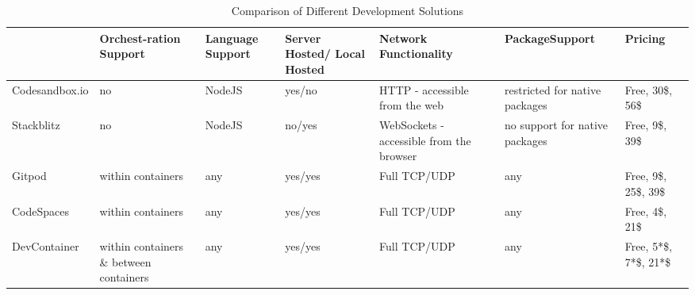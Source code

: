 
\begin{landscape}
\begin{table}[]
    \begin{tabular}{@{}lp{}p{}p{}p{}p{}p{}@{}}
    \toprule
                    & Orchest-ration Support                   & Language Support & Server Hosted/ Local Hosted & Network \newline Functionality                      & Package\newline Support                & Pricing             \\ \toprule
    \rowcolor[HTML]{9B9B9B} Codesandbox.io & no                                      & NodeJS           & yes/no                     & HTTP - accessible from the web             & restricted for native packages & Free, 30\$, 56\$      \\
    Stackblitz     & no                                      & NodeJS           & no/yes                     & WebSockets - accessible from the browser & no support for native packages & Free, 9\$, 39\$       \\
    \rowcolor[HTML]{9B9B9B} Gitpod         & within containers                     & any              & yes/yes                    & Full TCP/UDP                               & any                            & Free, 9\$, 25\$, 39\$ \\
    CodeSpaces     & within containers                     & any              & yes/yes                    & Full TCP/UDP                               & any                            & Free, 4\$, 21\$       \\
    \rowcolor[HTML]{9B9B9B} DevContainer   & within containers \& between containers  & any              & yes/yes                    & Full TCP/UDP                               & any                            & Free, 5*\$, 7*\$, 21*\$               \\
    \end{tabular}%
    \caption{Comparison of Different Development Solutions}\label{tab::env_compare}
\end{table}
\end{landscape}


